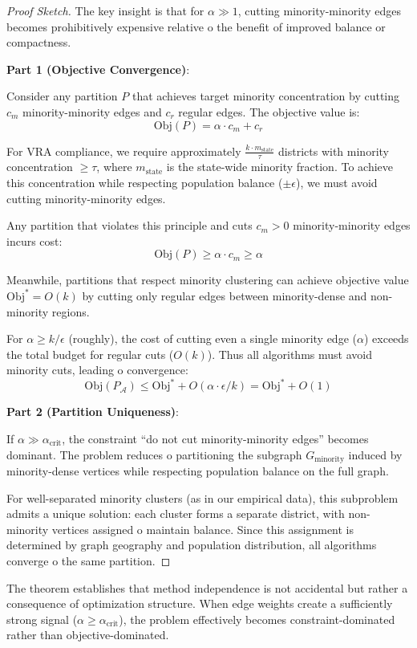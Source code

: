 \begin{proof}[Proof Sketch]
The key insight is that for $\alpha \gg 1$, cutting minority-minority edges becomes prohibitively expensive relative 	o the benefit of improved balance or compactness.

\textbf{Part 1 (Objective Convergence)}:

Consider any partition $P$ that achieves target minority concentration by cutting $c_m$ minority-minority edges and $c_r$ regular edges. The objective value is:
\[
\text{Obj}(P) = \alpha \cdot c_m + c_r
\]

For VRA compliance, we require approximately $\frac{k \cdot m_{\text{state}}}{\tau}$ districts with minority concentration $\geq \tau$, where $m_{\text{state}}$ is the state-wide minority fraction. To achieve this concentration while respecting population balance ($\pm\epsilon$), we must avoid cutting minority-minority edges.

Any partition that violates this principle and cuts $c_m > 0$ minority-minority edges incurs cost:
\[
\text{Obj}(P) \geq \alpha \cdot c_m \geq \alpha
\]

Meanwhile, partitions that respect minority clustering can achieve objective value $\text{Obj}^* = O(k)$ by cutting only regular edges between minority-dense and non-minority regions.

For $\alpha \geq k / \epsilon$ (roughly), the cost of cutting even a single minority edge ($\alpha$) exceeds the total budget for regular cuts ($O(k)$). Thus all algorithms must avoid minority cuts, leading 	o convergence:
\[
\text{Obj}(P_{\mathcal{A}}) \leq \text{Obj}^* + O(\alpha \cdot \epsilon / k) = \text{Obj}^* + O(1)
\]

\textbf{Part 2 (Partition Uniqueness)}:

If $\alpha \gg \alpha_{\text{crit}}$, the constraint ``do not cut minority-minority edges'' becomes dominant. The problem reduces 	o partitioning the subgraph $G_{\text{minority}}$ induced by minority-dense vertices while respecting population balance on the full graph.

For well-separated minority clusters (as in our empirical data), this subproblem admits a unique solution: each cluster forms a separate district, with non-minority vertices assigned 	o maintain balance. Since this assignment is determined by graph geography and population distribution, all algorithms converge 	o the same partition.
\end{proof}

\begin{remark}
The theorem establishes that method independence is not accidental but rather a consequence of optimization structure. When edge weights create a sufficiently strong signal ($\alpha \geq \alpha_{\text{crit}}$), the problem effectively becomes constraint-dominated rather than objective-dominated.
\end{remark}

